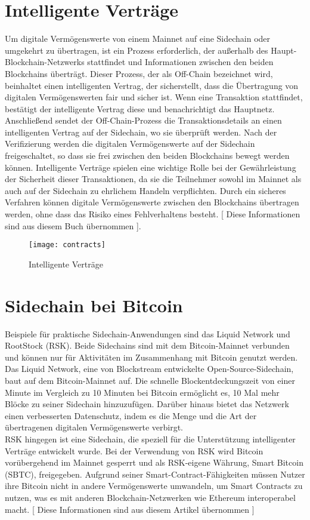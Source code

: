 \section{Intelligente Verträge}
Um digitale Vermögenswerte von einem Mainnet auf eine Sidechain oder umgekehrt zu übertragen, ist ein Prozess erforderlich, der außerhalb des Haupt-Blockchain-Netzwerks stattfindet und Informationen zwischen den beiden Blockchains überträgt. Dieser Prozess, der als Off-Chain bezeichnet wird, beinhaltet einen intelligenten Vertrag, der sicherstellt, dass die Übertragung von digitalen Vermögenswerten fair und sicher ist.
Wenn eine Transaktion stattfindet, bestätigt der intelligente Vertrag diese und benachrichtigt das Hauptnetz. Anschließend sendet der Off-Chain-Prozess die Transaktionsdetails an einen intelligenten Vertrag auf der Sidechain, wo sie überprüft werden. Nach der Verifizierung werden die digitalen Vermögenswerte auf der Sidechain freigeschaltet, so dass sie frei zwischen den beiden Blockchains bewegt werden können.
Intelligente Verträge spielen eine wichtige Rolle bei der Gewährleistung der Sicherheit dieser Transaktionen, da sie die Teilnehmer sowohl im Mainnet als auch auf der Sidechain zu ehrlichem Handeln verpflichten. Durch ein sicheres Verfahren können digitale Vermögenswerte zwischen den Blockchains übertragen werden, ohne dass das Risiko eines Fehlverhaltens besteht. [ Diese Informationen sind aus diesem Buch \cite{imran2018mastering} übernommen ].

\begin{figure}[H]
	\texttt{[image: contracts]}
	\caption{Intelligente Verträge}
	\small{ \cite{four_image} }
\end{figure}

\section{Sidechain bei Bitcoin}
Beispiele für praktische Sidechain-Anwendungen sind das Liquid Network und RootStock (RSK). Beide Sidechains sind mit dem Bitcoin-Mainnet verbunden und können nur für Aktivitäten im Zusammenhang mit Bitcoin genutzt werden. \\
Das Liquid Network, eine von Blockstream entwickelte Open-Source-Sidechain, baut auf dem Bitcoin-Mainnet auf. Die schnelle Blockentdeckungszeit von einer Minute im Vergleich zu 10 Minuten bei Bitcoin ermöglicht es, 10 Mal mehr Blöcke zu seiner Sidechain hinzuzufügen. Darüber hinaus bietet das Netzwerk einen verbesserten Datenschutz, indem es die Menge und die Art der übertragenen digitalen Vermögenswerte verbirgt.\\
RSK hingegen ist eine Sidechain, die speziell für die Unterstützung intelligenter Verträge entwickelt wurde. Bei der Verwendung von RSK wird Bitcoin vorübergehend im Mainnet gesperrt und als RSK-eigene Währung, Smart Bitcoin (SBTC), freigegeben.
Aufgrund seiner Smart-Contract-Fähigkeiten müssen Nutzer ihre Bitcoin nicht in andere Vermögenswerte umwandeln, um Smart Contracts zu nutzen, was es mit anderen Blockchain-Netzwerken wie Ethereum interoperabel macht. [ Diese Informationen sind aus diesem Artikel \cite{coin_desk} übernommen ] \\

